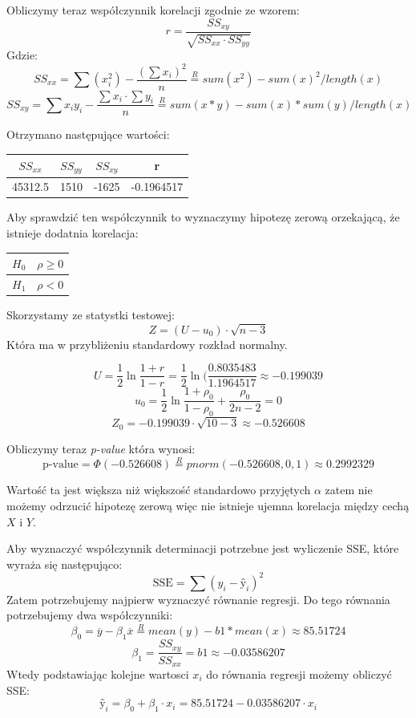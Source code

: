 \documentclass{article}
\begin{document}
Obliczymy teraz współczynnik korelacji zgodnie ze wzorem:
\[ r = \frac{SS_{xy}}{\sqrt{SS_{xx} \cdot SS_{yy}}} \]
Gdzie:
\[ SS_{xx} = \sum (x_i^2) - \frac{(\sum x_i )^2}{n} \overset{R}{=} sum(x^2) - sum(x)^2/length(x) \]
\[ SS_{xy} = \sum x_i y_i - \frac{\sum x_i \cdot \sum y_i}{n} \overset{R}{=} sum(x*y) - sum(x)*sum(y)/length(x) \]

Otrzymano następujące wartości:
\begin{center} \begin{tabular}{|c|c|c|c|} \hline
$SS_{xx}$ & $SS_{yy}$ & $SS_{xy}$ & r \\ \hline
45312.5 & 1510 & -1625 & -0.1964517 \\ \hline
\end{tabular} \end{center}

Aby sprawdzić ten współczynnik to wyznaczymy hipotezę zerową orzekającą, że istnieje dodatnia korelacja:
\begin{center} \begin{tabular}{|c|c|} \hline
$H_0$ & $\rho \geq 0$ \\ \hline
$H_1$ & $\rho < 0$ \\ \hline
\end{tabular} \end{center}

Skorzystamy ze statystki testowej:
\[ Z = (U - u_0) \cdot \sqrt{n-3} \]
Która ma w przybliżeniu standardowy rozkład normalny.

\[U = \frac{1}{2} \ln \frac{1+r}{1-r} = \frac{1}{2} \ln(\frac{0.8035483}{1.1964517} \approx -0.199039 \]
\[ u_0 = \frac{1}{2} \ln \frac{1+\rho_0}{1-\rho_0} + \frac{\rho_0}{2n-2} = 0 \]
\[ Z_0 = -0.199039 \cdot \sqrt{10 -3} \approx -0.526608 \]

Obliczymy teraz \textit{p-value} która wynosi:
\[ \text{p-value} = \Phi(-0.526608) \overset{R}{=} pnorm(-0.526608, 0, 1) \approx 0.2992329 \]

Wartość ta jest większa niż większość standardowo przyjętych $\alpha$ zatem nie możemy odrzucić hipotezę zerową więc nie istnieje ujemna korelacja między cechą $X$ i $Y$.

Aby wyznaczyć współczynnik determinacji potrzebne jest wyliczenie SSE, które wyraża się następująco:
\[ \text{SSE} = \sum (y_i - \text{\^y}_i)^2 \]
Zatem potrzebujemy najpierw wyznaczyć równanie regresji. Do tego równania potrzebujemy dwa współczynniki:
\[ \beta_0 = \overline{y} - \beta_1 \overline{x} \overset{R}{=} mean(y) - b1*mean(x) \approx 85.51724\]
\[ \beta_1 = \frac{SS_{xy}}{SS_{xx}} = b1 \approx -0.03586207\]
Wtedy podstawiając kolejne wartosci $x_i$ do równania regresji możemy obliczyć SSE:
\[ \text{\^y}_i = \beta_0 + \beta_1 \cdot x_i = 85.51724 - 0.03586207 \cdot x_i \]
\end{document}
